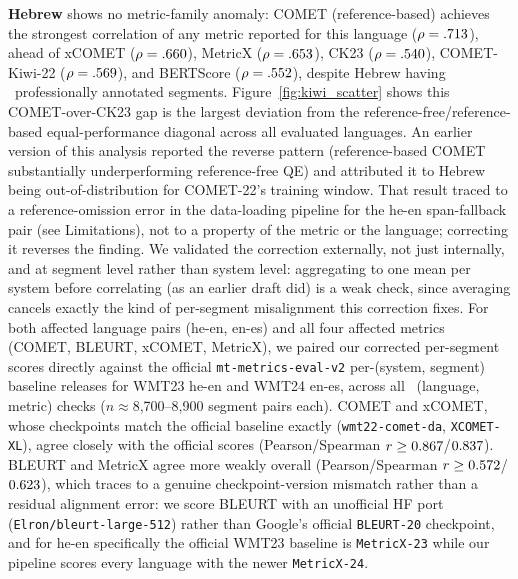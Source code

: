 \documentclass[11pt]{article}
\begin{document}
\textbf{Hebrew} shows no metric-family anomaly: COMET (reference-based) achieves the strongest correlation of any metric reported for this language ($\rho=.713$), ahead of xCOMET ($\rho=.660$), MetricX ($\rho=.653$), CK23 ($\rho=.540$), COMET-Kiwi-22 ($\rho=.569$), and BERTScore ($\rho=.552$), despite Hebrew having \LangNHE\ professionally annotated segments. Figure~\ref{fig:kiwi_scatter} shows this COMET-over-CK23 gap is the largest deviation from the reference-free/reference-based equal-performance diagonal across all evaluated languages. An earlier version of this analysis reported the reverse pattern (reference-based COMET substantially underperforming reference-free QE) and attributed it to Hebrew being out-of-distribution for COMET-22's training window. That result traced to a reference-omission error in the data-loading pipeline for the he-en span-fallback pair (see Limitations), not to a property of the metric or the language; correcting it reverses the finding. We validated the correction externally, not just internally, and at segment level rather than system level: aggregating to one mean per system before correlating (as an earlier draft did) is a weak check, since averaging cancels exactly the kind of per-segment misalignment this correction fixes. For both affected language pairs (he-en, en-es) and all four affected metrics (COMET, BLEURT, xCOMET, MetricX), we paired our corrected per-segment scores directly against the official \texttt{mt-metrics-eval-v2} \citep{freitag2023results} per-(system, segment) baseline releases for WMT23 he-en and WMT24 en-es, across all \BaselineValNChecks\ (language, metric) checks ($n\approx$8,700--8,900 segment pairs each). COMET and xCOMET, whose checkpoints match the official baseline exactly (\texttt{wmt22-comet-da}, \texttt{XCOMET-XL}), agree closely with the official scores (Pearson/Spearman $r\geq0.867$/$0.837$). BLEURT and MetricX agree more weakly overall (Pearson/Spearman $r\geq0.572$/$0.623$), which traces to a genuine checkpoint-version mismatch rather than a residual alignment error: we score BLEURT with an unofficial HF port (\texttt{Elron/bleurt-large-512}) rather than Google's official \texttt{BLEURT-20} checkpoint, and for he-en specifically the official WMT23 baseline is \texttt{MetricX-23} while our pipeline scores every language with the newer \texttt{MetricX-24}.
\end{document}
